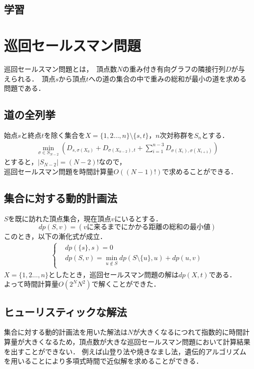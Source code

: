 \documentclass[a4paper,12pt]{jsreport}
\theoremstyle{definition}
\begin{document}
\section{学習}





\chapter{巡回セールスマン問題}
巡回セールスマン問題とは，\ 頂点数$N$の重み付き有向グラフの隣接行列$D$が与えられる．\ 頂点$s$から頂点$t$への道の集合の中で重みの総和が最小の道を求める問題である．
\section{道の全列挙}
始点$s$と終点$t$を除く集合を$X=\{1,2\ldots ,n\}\setminus\{s,t\}$，$n$次対称群を$S_n$とする．
\begin{eqnarray}
    \min_{\sigma\in S_{N-2}}
    \left(D_{s,\sigma(X_0)} + D_{\sigma(X_{n-2}),t} +
    \sum_{i=1}^{n-3}
        D_{\sigma(X_i),\sigma(X_{i+1})} 
    \right)
\end{eqnarray}
とすると，$|S_{N-2}|=(N-2)!$なので，\\ 巡回セールスマン問題を時間計算量$O((N-1)!)$で求めることができる．

\section{集合に対する動的計画法}
$S$を既に訪れた頂点集合，現在頂点$v$にいるとする．
$$dp(S,v)=(vに来るまでにかかる距離の総和の最小値)$$
このとき，以下の漸化式が成立．
\begin{eqnarray}
    \begin{cases}
        & dp(\{s\},s)=0\\
        & dp(S,v)=\min_{u \notin S}dp(S\setminus\{u\},u)+dp(u,v)
    \end{cases}
\end{eqnarray}
$X=\{1,2\ldots ,n\}$としたとき，巡回セールスマン問題の解は$dp(X,t)$である．\\
よって時間計算量$O(2^NN^2)$で解くことができた．
\section{ヒューリスティックな解法}
集合に対する動的計画法を用いた解法は$N$が大きくなるにつれて指数的に時間計算量が大きくなるため，頂点数が大きな巡回セールスマン問題において計算結果を出すことができない．
例えば山登り法や焼きなまし法，遺伝的アルゴリズムを用いることにより多項式時間で近似解を求めることができる．
\end{document}
